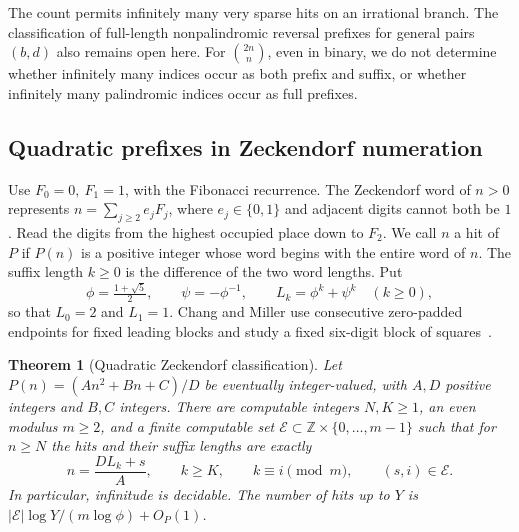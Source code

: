 \documentclass[11pt,reqno,a4paper]{amsart}
\newtheorem{theorem}{Theorem}[section]
\theoremstyle{remark}
\begin{document}
The count permits infinitely many very sparse hits on an irrational
branch. The classification of full-length nonpalindromic reversal
prefixes for general pairs \((b,d)\) also remains open here. For
\(\binom{2n}{n}\), even in binary, we do not determine whether
infinitely many indices occur as both prefix and suffix, or whether
infinitely many palindromic indices occur as full prefixes.

\subsection{Quadratic prefixes in Zeckendorf numeration}\label{sec:zeckendorf}

Use \(F_0=0,\ F_1=1\), with the Fibonacci recurrence. The
Zeckendorf word of \(n>0\) represents \(n=\sum_{j\ge2}e_j F_j\),
where \(e_j\in\{0,1\}\) and adjacent digits cannot both be \(1\).
Read the digits from the highest occupied place down to \(F_2\).
We call \(n\) a hit of \(P\) if \(P(n)\) is a positive integer whose
word begins with the entire word of \(n\). The suffix length \(k\ge0\)
is the difference of the two word lengths. Put
\[
 \phi=\tfrac{1+\sqrt5}{2},\qquad \psi=-\phi^{-1},\qquad
 L_k=\phi^k+\psi^k\quad(k\ge0),
\]
so that \(L_0=2\) and \(L_1=1\). Chang and Miller use consecutive
zero-padded endpoints for fixed leading blocks and study a fixed
six-digit block of squares~\cite[Lemma~4.4, proof, and Example~4.11]{zec-chang-miller}.

\begin{theorem}[Quadratic Zeckendorf classification]\label{thm:zeck-quadratic}
Let \(P(n)=(An^2+Bn+C)/D\) be eventually integer-valued, with
\(A,D\) positive integers and \(B,C\) integers. There are computable
integers \(N,K\ge1\), an even modulus \(m\ge2\), and a finite computable
set \(\mathcal E\subset\mathbb Z\times\{0,\ldots,m-1\}\) such that for
\(n\ge N\) the hits and their suffix lengths are exactly
\begin{equation}\label{eq:zeck-lucas-families}
 n=\frac{D L_k+s}{A},\qquad
 k\ge K,\qquad k\equiv i\pmod m,\qquad (s,i)\in\mathcal E .
\end{equation}
In particular, infinitude is decidable. The number of hits up to \(Y\)
is \(\lvert\mathcal E\rvert\log Y/(m\log\phi)+O_P(1)\).
\end{theorem}
\end{document}
